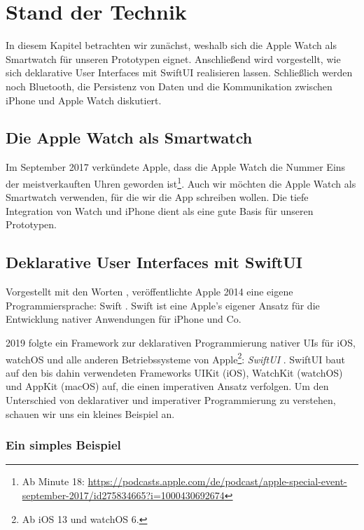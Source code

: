 \chapter{Stand der Technik}

In diesem Kapitel betrachten wir zunächst, weshalb sich die Apple Watch als Smartwatch für unseren Prototypen eignet. Anschließend wird vorgestellt, wie sich deklarative User Interfaces mit SwiftUI realisieren lassen. Schließlich werden noch Bluetooth, die Persistenz von Daten und die Kommunikation zwischen iPhone und Apple Watch diskutiert.

\section{Die Apple Watch als Smartwatch}

Im September 2017 verkündete Apple, dass die Apple Watch die Nummer Eins der meistverkauften Uhren geworden ist\footnote{Ab Minute 18: \url{https://podcasts.apple.com/de/podcast/apple-special-event-september-2017/id275834665?i=1000430692674}}. Auch wir möchten die Apple Watch als Smartwatch verwenden, für die wir die App schreiben wollen. Die tiefe Integration von Watch und iPhone dient als eine gute Basis für unseren Prototypen.

\section{Deklarative User Interfaces mit SwiftUI}

Vorgestellt mit den Worten \cite{Apple::WWDC-2014}, veröffentlichte Apple 2014 eine eigene Programmiersprache: Swift \cite{Apple::Swift-Documentation}.
Swift ist eine Apple's eigener Ansatz für die Entwicklung nativer Anwendungen für iPhone und Co.

2019 folgte ein Framework zur deklarativen Programmierung nativer \aclp{UI} für iOS, watchOS und alle anderen Betriebssysteme von Apple\footnote{Ab iOS 13 und watchOS 6.}: \emph{SwiftUI} \cite{Apple::SwiftUI}. SwiftUI baut auf den bis dahin verwendeten Frameworks UIKit (iOS), WatchKit (watchOS) und AppKit (macOS) auf, die einen imperativen Ansatz verfolgen. Um den Unterschied von deklarativer und imperativer Programmierung zu verstehen, schauen wir uns ein kleines Beispiel an.

\subsection{Ein simples Beispiel}

